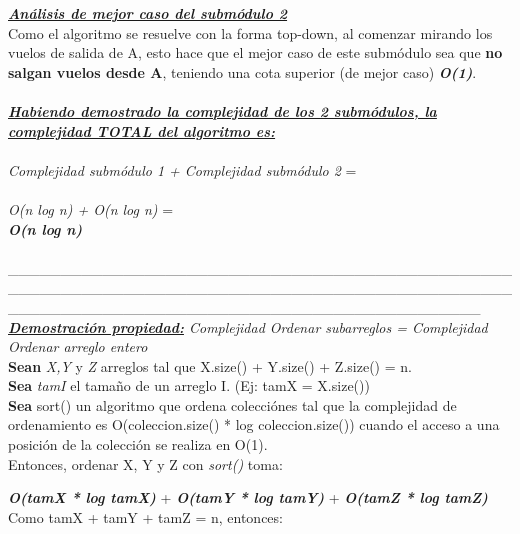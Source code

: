 \textit{\textbf{\underline{Análisis de mejor caso del submódulo 2}}}\\
Como el algoritmo se resuelve con la forma top-down, al comenzar mirando los vuelos de salida de A, esto hace que el mejor caso de este submódulo sea que \textbf{no salgan vuelos desde A}, teniendo una cota superior (de mejor caso) \textit{\textbf{O(1)}}.\\ \\

\noindent \underline{\textbf{\textit{Habiendo demostrado la complejidad de los 2 submódulos, la complejidad TOTAL del algoritmo es:}}} \\ \\
\textit{Complejidad submódulo 1 + Complejidad submódulo 2} = \\ \\
\textit{O(n log n) + O(n log n)} = \\ 

\noindent \textbf{\textit{O(n log n)}}\\ \\
\_\_\_\_\_\_\_\_\_\_\_\_\_\_\_\_\_\_\_\_\_\_\_\_\_\_\_\_\_\_\_\_\_\_\_\_\_\_\_\_\_\_\_\_\_\_\_\_\_\_\_\_\_\_\_\_\_\_\_\_\_\_\_\_\_\_\_\_\_\_\_\_\_\_\_\_\_\_\_\_\_\_\_\_\_\_\_\_\_\_\_\_\_\_\_\_\_\_\_\_\_\_\_\_\_\_\_\_\_\_\_\_\_\_\_\_\_\_\_\_\_\_\_\_\_\_\_\_\_\_\_\_\_\_\_\_\_\_\_\_\_
\\

\noindent \textit{\underline{\textbf{Demostración propiedad:}} Complejidad Ordenar subarreglos = Complejidad Ordenar arreglo entero}\\

\noindent \textbf{Sean} \textit{X,Y} y \textit{Z} arreglos tal que X.size() + Y.size() + Z.size() = n.\\
\textbf{Sea} \textit{tamI} el tamaño de un arreglo I. (Ej: tamX = X.size())\\
\textbf{Sea} sort() un algoritmo que ordena colecciónes tal que la complejidad de ordenamiento es O(coleccion.size() * log coleccion.size()) cuando el acceso a una posición de la colección se realiza en O(1).\\

\noindent Entonces, ordenar X, Y y Z con \textit{sort()} toma:

\indent \textit{\textbf{O(tamX * log tamX)}} + \textit{\textbf{O(tamY * log tamY)}} + \textit{\textbf{O(tamZ * log tamZ)}}\\

\noindent Como tamX + tamY + tamZ = n, entonces:

